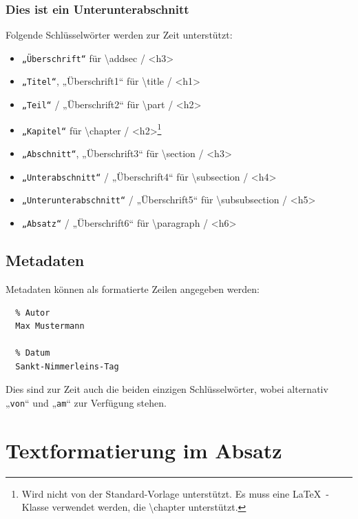 \documentclass{scrartcl}
\begin{document}
\subsubsection{Dies ist ein Unterunterabschnitt}

{Folgende Schlüsselwörter werden zur Zeit unterstützt:\\}

\begin{itemize}
\item \texttt{„Überschrift“} für \textbackslash addsec / <h3>
\item \texttt{„Titel“}, „Überschrift1“  für \textbackslash title / <h1>
\item \texttt{„Teil“} / „Überschrift2“ für \textbackslash part / <h2>
\item \texttt{„Kapitel“} für \textbackslash chapter / <h2>\footnote{Wird nicht von der Standard-Vorlage unterstützt. Es muss eine \LaTeX\ -Klasse verwendet werden, die \textbackslash chapter unterstützt.}\xspace  
\item \texttt{„Abschnitt“}, „Überschrift3“ für \textbackslash section / <h3>
\item \texttt{„Unterabschnitt“} / „Überschrift4“ für \textbackslash subsection / <h4>
\item \texttt{„Unterunterabschnitt“} / „Überschrift5“ für \textbackslash subsubsection / <h5>
\item \texttt{„Absatz“} / „Überschrift6“ für \textbackslash paragraph / <h6>
\end{itemize}


\subsection{Metadaten}

{Metadaten können als formatierte Zeilen angegeben werden:\\}

\begin{verbatim}
  % Autor
  Max Mustermann

  % Datum
  Sankt-Nimmerleins-Tag
\end{verbatim}


{Dies sind zur Zeit auch die beiden einzigen Schlüsselwörter,
wobei alternativ „\texttt{von}“ und „\texttt{am}“ zur Verfügung stehen.\\}

\section{Textformatierung im Absatz}
\end{document}
